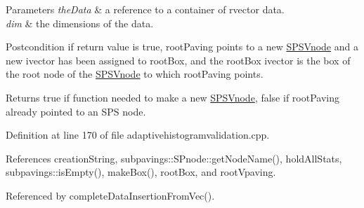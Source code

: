 \begin{DoxyParams}{\-Parameters}
{\em the\-Data} & a reference to a container of rvector data. \\
\hline
{\em dim} & the dimensions of the data. \\
\hline
\end{DoxyParams}
\begin{DoxyPostcond}{\-Postcondition}
if return value is true, root\-Paving points to a new \hyperlink{classsubpavings_1_1SPSVnode}{\-S\-P\-S\-Vnode} and a new ivector has been assigned to root\-Box, and the root\-Box ivector is the box of the root node of the \hyperlink{classsubpavings_1_1SPSVnode}{\-S\-P\-S\-Vnode} to which root\-Paving points. 
\end{DoxyPostcond}
\begin{DoxyReturn}{\-Returns}
true if function needed to make a new \hyperlink{classsubpavings_1_1SPSVnode}{\-S\-P\-S\-Vnode}, false if root\-Paving already pointed to an \-S\-P\-S node. 
\end{DoxyReturn}


\-Definition at line 170 of file adaptivehistogramvalidation.\-cpp.



\-References creation\-String, subpavings\-::\-S\-Pnode\-::get\-Node\-Name(), hold\-All\-Stats, subpavings\-::is\-Empty(), make\-Box(), root\-Box, and root\-Vpaving.



\-Referenced by complete\-Data\-Insertion\-From\-Vec().


